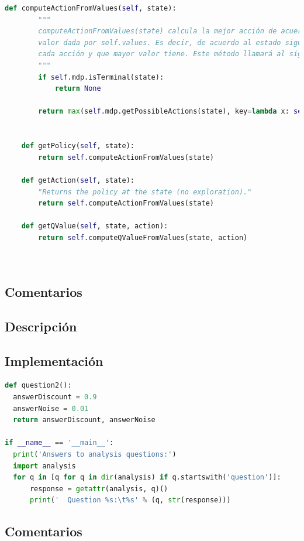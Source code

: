 \documentclass{report}
\begin{document}
\begin{lstlisting}[language=Python, caption=Iteración de valores]
    def computeActionFromValues(self, state):
        """
        computeActionFromValues(state) calcula la mejor acción de acuerdo con la función de
        valor dada por self.values. Es decir, de acuerdo al estado siguiente al que nos lleva
        cada acción y que mayor valor tiene. Este método llamará al siguiente.
        """
        if self.mdp.isTerminal(state):
            return None

        return max(self.mdp.getPossibleActions(state), key=lambda x: self.computeQValueFromValues(state, x))
        

    def getPolicy(self, state):
        return self.computeActionFromValues(state)

    def getAction(self, state):
        "Returns the policy at the state (no exploration)."
        return self.computeActionFromValues(state)

    def getQValue(self, state, action):
        return self.computeQValueFromValues(state, action)

    
\end{lstlisting}
      \subsection*{Comentarios}
        \paragraph*{}{

        }
      \subsection*{Descripción}
      \subsection*{Implementación}
\begin{lstlisting}[language=Python, caption=Análisis de cruce de puentes]
def question2():
  answerDiscount = 0.9
  answerNoise = 0.01
  return answerDiscount, answerNoise

if __name__ == '__main__':
  print('Answers to analysis questions:')
  import analysis
  for q in [q for q in dir(analysis) if q.startswith('question')]:
      response = getattr(analysis, q)()
      print('  Question %s:\t%s' % (q, str(response)))
\end{lstlisting}
      \subsection*{Comentarios}
\end{document}
